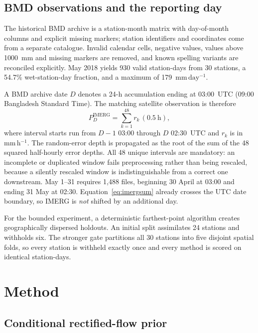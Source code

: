 \documentclass[10pt,twocolumn]{article}
\newcommand{\mmday}{\mathrm{mm\,day^{-1}}}
\begin{document}
\subsection{BMD observations and the reporting day}

The historical BMD archive is a station-month matrix with day-of-month columns
and explicit missing markers; station identifiers and coordinates come from a
separate catalogue. Invalid calendar cells, negative values, values above
1000~mm and missing markers are removed, and known spelling variants are
reconciled explicitly. May 2018 yields 930 valid station-days from 30
stations, a 54.7\% wet-station-day fraction, and a maximum of 179~$\mmday$.

A BMD archive date $D$ denotes a 24-h accumulation ending at 03:00~UTC
(09:00 Bangladesh Standard Time). The matching satellite observation is
therefore
\begin{equation}
 P_D^{\mathrm{IMERG}} = \sum_{k=1}^{48} r_k\,(0.5~\mathrm{h}),
 \label{eq:imergsum}
\end{equation}
where interval starts run from $D-1$ 03:00 through $D$ 02:30~UTC and $r_k$ is
in mm\,h$^{-1}$. The random-error depth is propagated as the root of the sum
of the 48 squared half-hourly error depths. All 48 unique intervals are
mandatory: an incomplete or duplicated window fails preprocessing rather than
being rescaled, because a silently rescaled window is indistinguishable from a
correct one downstream. May 1--31 requires 1{,}488 files, beginning 30 April at
03:00 and ending 31 May at 02:30. Equation~\eqref{eq:imergsum} already crosses
the UTC date boundary, so IMERG is \emph{not} shifted by an additional day.

For the bounded experiment, a deterministic farthest-point algorithm creates
geographically dispersed holdouts. An initial split assimilates 24 stations and
withholds six. The stronger gate partitions all 30 stations into five disjoint
spatial folds, so every station is withheld exactly once and every method is
scored on identical station-days.

\section{Method}

\subsection{Conditional rectified-flow prior}
\end{document}

